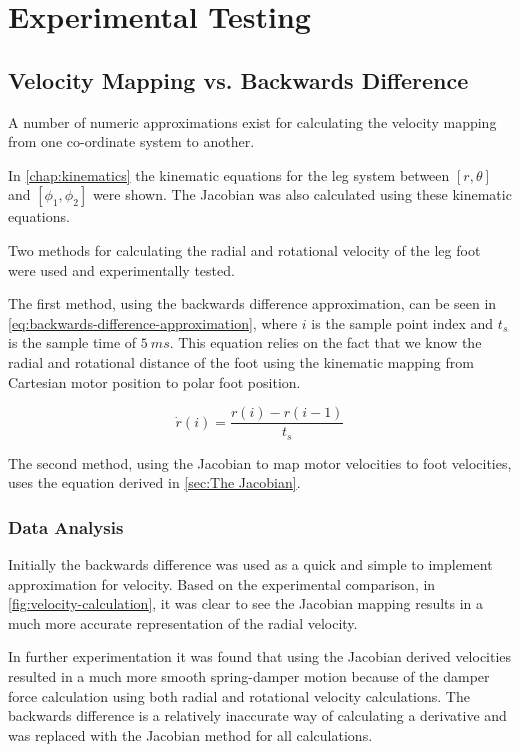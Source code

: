 \chapter{Experimental Testing}
\label{chap:Experimental Testing}

\section{Velocity Mapping vs. Backwards Difference}
\label{sec:Velocity Mapping vs Backwards Difference}

A number of numeric approximations exist for calculating the velocity mapping from one co-ordinate system to another. 

In \cref{chap:kinematics} the kinematic equations for the leg system between $[r, \theta]$ and $[\phi_1, \phi_2]$ were shown. The Jacobian was also calculated using these kinematic equations.

Two methods for calculating the radial and rotational velocity of the leg foot were used and experimentally tested. 

The first method, using the backwards difference approximation, can be seen in \cref{eq:backwards-difference-approximation}, where $i$ is the sample point index and $t_s$ is the sample time of $5\ ms$. This equation relies on the fact that we know the radial and rotational distance of the foot using the kinematic mapping from Cartesian motor position to polar foot position. 

\begin{equation} \label{eq:backwards-difference-approximation}
\dot{r}(i) = \frac{r(i)-r(i-1)}{t_s}
\end{equation}

The second method, using the Jacobian to map motor velocities to foot velocities, uses the equation derived in \cref{sec:The Jacobian}.

\subsection{Data Analysis}
Initially the backwards difference was used as a quick and simple to implement approximation for velocity. Based on the experimental comparison, in \cref{fig:velocity-calculation}, it was clear to see the Jacobian mapping results in a much more accurate representation of the radial velocity. 

In further experimentation it was found that using the Jacobian derived velocities resulted in a much more smooth spring-damper motion because of the damper force calculation using both radial and rotational velocity calculations. The backwards difference is a relatively inaccurate way of calculating a derivative and was replaced with the Jacobian method for all calculations.

